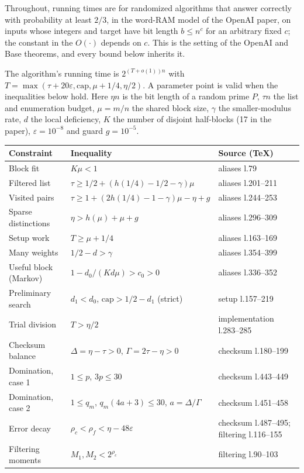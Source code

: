 \documentclass[11pt]{article}
\newcommand{\eps}{\varepsilon}
\theoremstyle{plain}
\begin{document}
Throughout, running times are for randomized algorithms that answer correctly with probability at least $2/3$, in the word-RAM model of the OpenAI paper, on inputs whose integers and target have bit length $b \le n^c$ for an arbitrary fixed $c$; the constant in the $O(\cdot)$ depends on $c$. This is the setting of the OpenAI and Base theorems, and every bound below inherits it.

The algorithm's running time is $2^{(T+o(1))n}$ with $T = \max(\tau + 20\eps, \mathrm{cap}, \mu + 1/4, \eta/2)$. A parameter point is valid when the inequalities below hold. Here $\eta n$ is the bit length of a random prime $P$, $\tau n$ the list and enumeration budget, $\mu = m/n$ the shared block size, $\gamma$ the smaller-modulus rate, $d$ the local deficiency, $K$ the number of disjoint half-blocks (17 in the paper), $\eps = 10^{-8}$ and guard $g = 10^{-5}$.

\begin{center}
\small
\begin{tabularx}{\linewidth}{>{\raggedright\arraybackslash}p{3.2cm} L >{\raggedright\arraybackslash}p{3.6cm}}
\toprule
Constraint & Inequality & Source (TeX) \\
\midrule
Block fit & $K\mu < 1$ & aliases l.79 \\
Filtered list & $\tau \ge 1/2 + (h(1/4) - 1/2 - \gamma)\mu$ & aliases l.201--211 \\
Visited pairs & $\tau \ge 1 + (2h(1/4) - 1 - \gamma)\mu - \eta + g$ & aliases l.244--253 \\
Sparse distinctions & $\eta > h(\mu) + \mu + g$ & aliases l.296--309 \\
Setup work & $T \ge \mu + 1/4$ & aliases l.163--169 \\
Many weights & $1/2 - d > \gamma$ & aliases l.354--399 \\
Useful block (Markov) & $1 - d_0/(K d \mu) > c_0 > 0$ & aliases l.336--352 \\
Preliminary search & $d_1 < d_0$, $\mathrm{cap} > 1/2 - d_1$ (strict) & setup l.157--219 \\
Trial division & $T > \eta/2$ & implementation l.283--285 \\
Checksum balance & $\Delta = \eta - \tau > 0$, $\Gamma = 2\tau - \eta > 0$ & checksum l.180--199 \\
Domination, case 1 & $1 \le p$, $3p \le 30$ & checksum l.443--449 \\
Domination, case 2 & $1 \le q_m$, $q_m(4a + 3) \le 30$, $a = \Delta/\Gamma$ & checksum l.451--458 \\
Error decay & $\rho_c < \rho_f < \eta - 48\eps$ & checksum l.487--495; filtering l.116--155 \\
Filtering moments & $M_1, M_2 < 2^{\rho_c}$ & filtering l.90--103 \\
\bottomrule
\end{tabularx}
\end{center}
\end{document}
